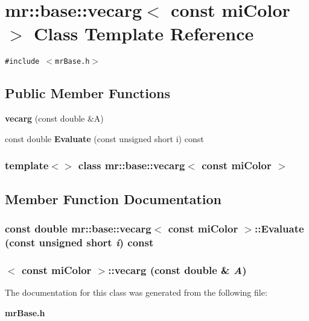 \section{mr::base::vecarg$<$ const mi\-Color $>$ Class Template Reference}
\label{classmr_1_1base_1_1vecarg_3_01const_01miColor_01_4}
{\tt \#include $<$mr\-Base.h$>$}

\subsection*{Public Member Functions}
\begin{CompactItemize}
\item 
{\bf vecarg} (const double \&A)
\item 
const double {\bf Evaluate} (const unsigned short i) const 
\end{CompactItemize}
\subsubsection*{template$<$$>$ class mr::base::vecarg$<$ const mi\-Color $>$}



\subsection{Member Function Documentation}
\subsubsection{\setlength{\rightskip}{0pt plus 5cm}const double {\bf mr::base::vecarg}$<$ const mi\-Color $>$::Evaluate (const unsigned short {\em i}) const\hspace{0.3cm}{\tt  [inline]}}\label{classmr_1_1base_1_1vecarg_3_01const_01miColor_01_4_a1}


\subsubsection{$<$ const mi\-Color $>$::{\bf vecarg} (const double \& {\em A})\hspace{0.3cm}{\tt  [inline]}}\label{classmr_1_1base_1_1vecarg_3_01const_01miColor_01_4_a0}




The documentation for this class was generated from the following file:\begin{CompactItemize}
\item 
{\bf mr\-Base.h}\end{CompactItemize}
